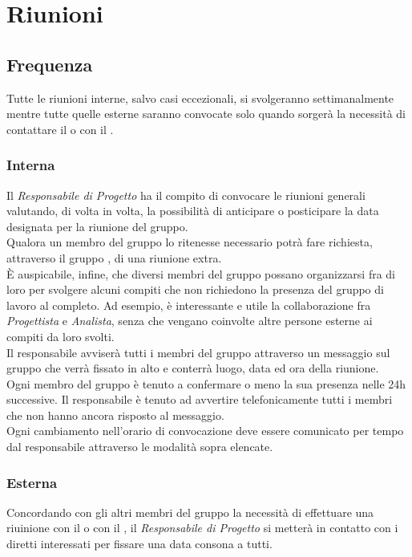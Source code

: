 \section{Riunioni}
  \subsection{Frequenza}
    Tutte le riunioni interne, salvo casi eccezionali, si svolgeranno settimanalmente mentre tutte quelle esterne saranno convocate solo quando sorgerà la necessità di contattare il  o con il .

    \subsubsection{Interna}
      Il \emph{Responsabile di Progetto} ha il compito di convocare le riunioni generali valutando, di volta in volta, la possibilità di anticipare o posticipare la data
      designata per la riunione del gruppo.\\
      Qualora un membro del gruppo lo ritenesse necessario potrà fare richiesta, attraverso il gruppo \textbf{}, di una riunione extra.\\
      È auspicabile, infine, che diversi membri del gruppo possano organizzarsi fra di loro per svolgere alcuni compiti che non richiedono la presenza  del gruppo di lavoro
      al completo. Ad esempio, è interessante e utile la collaborazione fra \emph{Progettista} e \emph{Analista}, senza che vengano coinvolte altre persone esterne ai compiti
      da loro svolti.\\
      Il responsabile avviserà tutti i membri del gruppo attraverso un messaggio sul gruppo \textbf{} che verrà fissato in alto e conterrà luogo, data ed ora della riunione.\\
      Ogni membro del gruppo è tenuto a confermare o meno la sua presenza nelle 24h successive. Il responsabile è tenuto ad avvertire telefonicamente tutti i membri che
      non hanno ancora risposto al messaggio.\\
      Ogni cambiamento nell'orario di convocazione deve essere comunicato per tempo dal responsabile attraverso le modalità sopra elencate.
    \subsubsection{Esterna}
      Concordando con gli altri membri del gruppo la necessità di effettuare una riuinione con il  o con il , il \emph{Responsabile di Progetto}
      si metterà in contatto con i diretti interessati per fissare una data consona a tutti.
